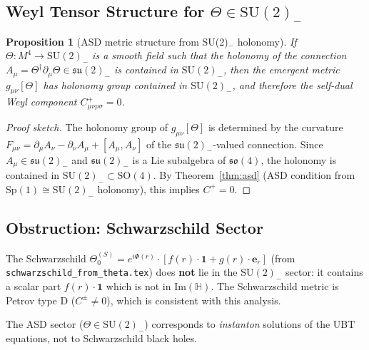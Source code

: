 \documentclass[11pt,a4paper]{article}
\newtheorem{proposition}[theorem]{Proposition}
\theoremstyle{definition}
\theoremstyle{remark}
\begin{document}
\subsection{Weyl Tensor Structure for $\Theta \in \mathrm{SU}(2)_-$}

\begin{proposition}[ASD metric structure from SU(2)$_-$ holonomy]
\label{prop:asd_holonomy}
If $\Theta: M^4 \to \mathrm{SU}(2)_-$ is a smooth field such that the
holonomy of the connection $A_\mu = \Theta^\dagger\partial_\mu\Theta \in
\mathfrak{su}(2)_-$ is contained in $\mathrm{SU}(2)_-$, then the
emergent metric $g_{\mu\nu}[\Theta]$ has holonomy group contained in
$\mathrm{SU}(2)_-$, and therefore the self-dual Weyl component
$C^+_{\mu\nu\rho\sigma} = 0$.
\end{proposition}

\begin{proof}[Proof sketch]
The holonomy group of $g_{\mu\nu}[\Theta]$ is determined by the curvature
$F_{\mu\nu} = \partial_\mu A_\nu - \partial_\nu A_\mu + [A_\mu, A_\nu]$
of the $\mathfrak{su}(2)_-$-valued connection.  Since $A_\mu \in \mathfrak{su}(2)_-$
and $\mathfrak{su}(2)_-$ is a Lie subalgebra of $\mathfrak{so}(4)$, the holonomy
is contained in $\mathrm{SU}(2)_- \subset \mathrm{SO}(4)$.  By
Theorem~\ref{thm:asd} (ASD condition from $\mathrm{Sp}(1) \cong \mathrm{SU}(2)_-$
holonomy), this implies $C^+ = 0$.
\end{proof}

\subsection{Obstruction: Schwarzschild Sector}

\begin{tcolorbox}[colback=orange!10!white,colframe=orange!75!black,
                  title={Obstruction: Schwarzschild Not in SU(2)$_-$ Sector}]
The Schwarzschild $\Theta_0^{(S)} = e^{i\Phi(r)}\cdot[f(r)\cdot\mathbf{1} +
g(r)\cdot\boldsymbol{e}_r]$ (from \texttt{schwarzschild\_from\_theta.tex})
does \textbf{not} lie in the $\mathrm{SU}(2)_-$ sector: it contains a
scalar part $f(r)\cdot\mathbf{1}$ which is not in $\mathrm{Im}(\mathbb{H})$.
The Schwarzschild metric is Petrov type D ($C^{\pm} \neq 0$), which is
consistent with this analysis.

The ASD sector ($\Theta \in \mathrm{SU}(2)_-$) corresponds to \emph{instanton}
solutions of the UBT equations, not to Schwarzschild black holes.
\end{tcolorbox}
\end{document}
